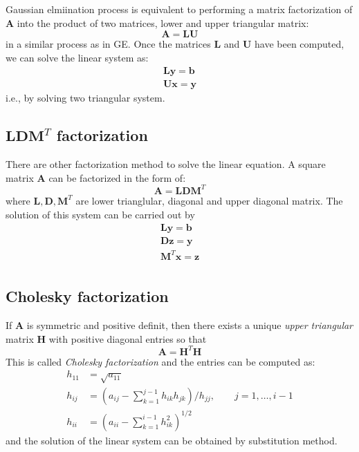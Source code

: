 \documentclass{article}
\begin{document}
Gaussian elmiination process is equivalent to performing a matrix factorization of $\mathbf{A}$
into the product of two matrices, lower and upper triangular matrix:
\[\mathbf{A} = \mathbf{L} \mathbf{U}\]
in a similar process as in GE. 
Once the matrices $\mathbf{L}$ and $\mathbf{U}$ have been computed, we can solve the linear 
system as:
\begin{align*}
    \mathbf{L}\mathbf{y} = \mathbf{b} \\
    \mathbf{U}\mathbf{x} = \mathbf{y}
\end{align*}
i.e., by solving two triangular system.

\subsection{$\mathbf{L} \mathbf{D} \mathbf{M}^T$ factorization}
There are other factorization method to solve the linear equation.
A square matrix $\mathbf{A}$ can be factorized in the form of:
\begin{equation}
    \mathbf{A} = \mathbf{L} \mathbf{D} \mathbf{M}^T
\end{equation}
where $\mathbf{L}, \mathbf{D}, \mathbf{M}^T$ are lower trianglular, diagonal and 
upper diagonal matrix. The solution of this system can be carried out by 
\begin{align*}
    \mathbf{L}  \mathbf{y} = \mathbf{b} \\
    \mathbf{D}  \mathbf{z} = \mathbf{y} \\
    \mathbf{M}^T\mathbf{x} = \mathbf{z} \\
\end{align*}

\subsection{Cholesky factorization}
If $\mathbf{A}$ is symmetric and positive definit, then there exists a unique 
\emph{upper triangular} matrix $\mathbf{H}$ with positive diagonal entries so 
that 
\[ \mathbf{A} = \mathbf{H}^T \mathbf{H} \]
This is called \emph{Cholesky factorization} and the entries can be computed as:
\begin{align*}
    h_{11} &= \sqrt{a_{11}} \\
    h_{ij} &= \left( a_{ij} - \sum_{k=1}^{j-1} h_{ik}h_{jk} \right) / h_{jj}, \qquad j = 1,\dots,i-1 \\
    h_{ii} &= \left( a_{ii} - \sum_{k=1}^{i-1} h_{ik}^2 \right)^{1/2}
\end{align*}
and the solution of the linear system can be obtained by substitution method.
\end{document}
